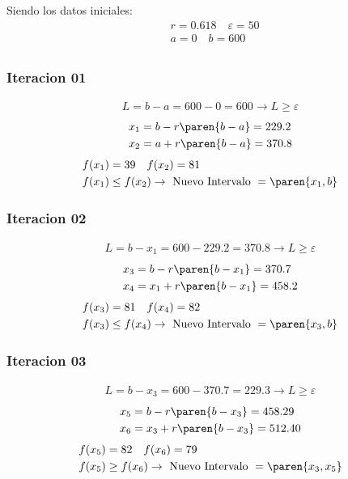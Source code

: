 \begin{homeworkProblem}[-1][Hughesco]
Siendo los datos iniciales:
\begin{align*}
    &r=0.618\quad \varepsilon = 50 \\
    &a=0\quad  b=600\\
\end{align*}


\subsubsection{Iteracion 01}
\begin{align*}
    L=b-a=600-0=600 \rightarrow L \geq \varepsilon
\end{align*}
\begin{align*}
    &x_1=b - r\paren{b-a}= 229.2 \\
    &x_2=a + r\paren{b-a}= 370.8 
\end{align*}
\begin{align*}
    &f(x_1)=39 \quad f(x_2)=81 \\
    &f(x_1) \leq f(x_2) \rightarrow \text{ Nuevo Intervalo } = \paren{x_1,b}
\end{align*}


\subsubsection{Iteracion 02}
\begin{align*}
    L=b-x_1=600-229.2=370.8 \rightarrow L \geq \varepsilon
\end{align*}
\begin{align*}
    &x_3=b - r\paren{b-x_1}= 370.7 \\
    &x_4=x_1 + r\paren{b-x_1}= 458.2
\end{align*}
\begin{align*}
    &f(x_3)=81 \quad f(x_4)=82 \\
    &f(x_3) \leq f(x_4) \rightarrow \text{ Nuevo Intervalo } = \paren{x_3,b}
\end{align*}

\subsubsection{Iteracion 03}
\begin{align*}
    L=b-x_3=600-370.7=229.3 \rightarrow L \geq \varepsilon
\end{align*}
\begin{align*}
    &x_5=b - r\paren{b-x_3}= 458.29 \\
    &x_6=x_3 + r\paren{b-x_3}= 512.40
\end{align*}
\begin{align*}
    &f(x_5)=82 \quad f(x_6)=79 \\
    &f(x_5) \geq f(x_6) \rightarrow \text{ Nuevo Intervalo } = \paren{x_3,x_5}
\end{align*}


\end{homeworkProblem}
